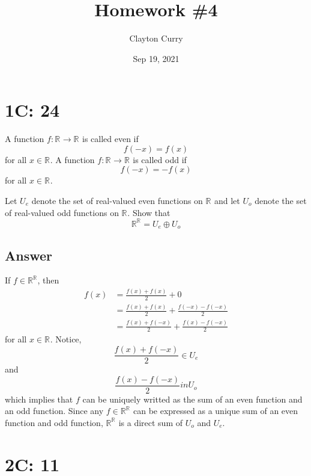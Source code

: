 \documentclass[
	12pt, %
]{fphw}
\title{Homework \#4} %
\author{Clayton Curry} %
\date{Sep 19, 2021} %
\institute{University of Oklahoma \\ Department of Mathematics} %
\newcommand\0{\mathbf{0}}
\newcommand\qed{\text{$\blacksquare$}}
\newcommand\R[1]{\text{$\mathbb{R}^{#1}$}}
\begin{document}
\maketitle %


\section*{1C: 24}

\begin{problem}
A function $f : \R{} \to \R{}$ is called even if
$$
f(-x) = f (x)
$$
for all $x \in \R{}$. A function $f : \R{} \to \R{}$ is called odd if
$$
f(-x) = -f(x)
$$
for all $x \in \R{}$. 

Let $U_e$ denote the set of real-valued even functions on $\R{}$ and let $U_o$ denote the set of real-valued odd functions on $\R{}$. Show that
$$
\R{\R{}} = U_e \oplus U_o
$$
\end{problem}


\subsection*{Answer} 
If $f \in \R{\R{}}$, then
\begin{align*}
f(x) &= \frac{f(x) + f(x)}{2} + 0\\
&=\frac{f(x) + f(x)}{2} + \frac{f(-x) - f(-x)}{2}\\
&=\frac{f(x) + f(-x)}{2} + \frac{f(x) - f(-x)}{2}
\end{align*}
for all $x \in \R{}$. Notice, 
$$
\frac{f(x) + f(-x)}{2} \in U_e
$$
and
$$
 \frac{f(x) - f(-x)}{2} in U_o
$$
which implies that $f$ can be uniquely writted as the sum of an even function and an odd function. Since any $f \in \R{\R{}}$ can be expressed as a unique sum of an even function and odd function, $\R{\R{}}$ is a direct sum of $U_o$  and $U_e$. \qed

\newpage
\section*{2C: 11}
\begin{problem}

\end{problem}
\end{document}
